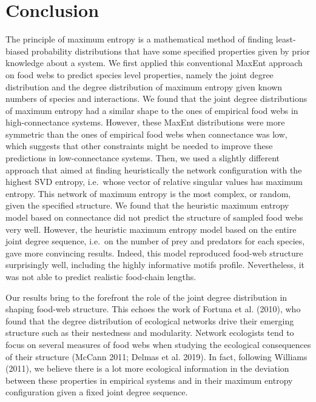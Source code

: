 \documentclass[11pt]{article}
\begin{document}
\hypertarget{conclusion}{%
\section{Conclusion}\label{conclusion}}

The principle of maximum entropy is a mathematical method of finding
least-biased probability distributions that have some specified
properties given by prior knowledge about a system. We first applied
this conventional MaxEnt approach on food webs to predict species level
properties, namely the joint degree distribution and the degree
distribution of maximum entropy given known numbers of species and
interactions. We found that the joint degree distributions of maximum
entropy had a similar shape to the ones of empirical food webs in
high-connectance systems. However, these MaxEnt distributions were more
symmetric than the ones of empirical food webs when connectance was low,
which suggests that other constraints might be needed to improve these
predictions in low-connectance systems. Then, we used a slightly
different approach that aimed at finding heuristically the network
configuration with the highest SVD entropy, i.e.~whose vector of
relative singular values has maximum entropy. This network of maximum
entropy is the most complex, or random, given the specified structure.
We found that the heuristic maximum entropy model based on connectance
did not predict the structure of sampled food webs very well. However,
the heuristic maximum entropy model based on the entire joint degree
sequence, i.e.~on the number of prey and predators for each species,
gave more convincing results. Indeed, this model reproduced food-web
structure surprisingly well, including the highly informative motifs
profile. Nevertheless, it was not able to predict realistic food-chain
lengths.

Our results bring to the forefront the role of the joint degree
distribution in shaping food-web structure. This echoes the work of
Fortuna et al. (2010), who found that the degree distribution of
ecological networks drive their emerging structure such as their
nestedness and modularity. Network ecologists tend to focus on several
measures of food webs when studying the ecological consequences of their
structure (McCann 2011; Delmas et al. 2019). In fact, following Williams
(2011), we believe there is a lot more ecological information in the
deviation between these properties in empirical systems and in their
maximum entropy configuration given a fixed joint degree sequence.
\end{document}
